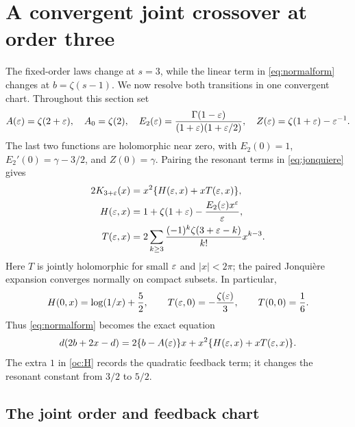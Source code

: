 \section{A convergent joint crossover at order three}
\label{sec:order-crossover}

The fixed-order laws change at $s=3$, while the linear term in
\eqref{eq:normalform} changes at $b=\zeta(s-1)$. We now resolve both
transitions in one convergent chart. Throughout this section set
\begin{equation}\label{oc:paired-functions}
 A(\varepsilon)=\zeta(2+\varepsilon),\quad A_0=\zeta(2),\quad
 E_2(\varepsilon)=\frac{\Gamma(1-\varepsilon)}{(1+\varepsilon)(1+\varepsilon/2)},\quad
 Z(\varepsilon)=\zeta(1+\varepsilon)-\varepsilon^{-1}.
\end{equation}
The last two functions are holomorphic near zero, with
$E_2(0)=1$, $E_2'(0)=\gamma-3/2$, and $Z(0)=\gamma$.
Pairing the resonant terms in \eqref{eq:jonquiere} gives
\begin{align}
 2K_{3+\varepsilon}(x)&=x^2\{H(\varepsilon,x)+xT(\varepsilon,x)\},
       \label{oc:paired-K}\\
 H(\varepsilon,x)&=1+\zeta(1+\varepsilon)-\frac{E_2(\varepsilon)x^\varepsilon}{\varepsilon},
       \label{oc:H}\\
 T(\varepsilon,x)&=2\sum_{k\ge3}
       \frac{(-1)^k\zeta(3+\varepsilon-k)}{k!}x^{k-3}.
       \label{oc:tail}
\end{align}
Here $T$ is jointly holomorphic for small $\varepsilon$ and $|x|<2\pi$;
the paired Jonqui\`ere expansion converges normally on compact
subsets. In particular,
\begin{equation}\label{oc:paired-values}
 H(0,x)=\log(1/x)+\frac52,\qquad
 T(\varepsilon,0)=-\frac{\zeta(\varepsilon)}3,\qquad T(0,0)=\frac16.
\end{equation}
Thus \eqref{eq:normalform} becomes the exact equation
\begin{equation}\label{oc:exact-equation}
 d(2b+2x-d)=2\{b-A(\varepsilon)\}x+x^2\{H(\varepsilon,x)+xT(\varepsilon,x)\}.
\end{equation}
The extra $1$ in \eqref{oc:H} records the quadratic feedback term;
it changes the resonant constant from $3/2$ to $5/2$.

\subsection{The joint order and feedback chart}


